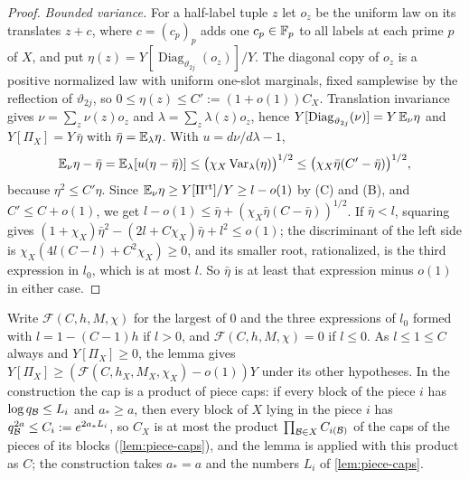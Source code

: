 \begin{proof}
\emph{Bounded variance.} For a half-label tuple $z$ let $o_z$ be the uniform law
on its translates $z+c$, where $c=(c_p)_p$ adds one $c_p\in\mathbb F_p$ to all labels at
each prime $p$ of $X$, and put $\eta(z)=Y[\operatorname{Diag}_{\vartheta_{2j}}
(o_z)]/Y$. The diagonal copy of $o_z$ is a positive normalized law with uniform
one-slot marginals, fixed samplewise by the reflection of $\vartheta_{2j}$, so
$0\le\eta(z)\le C':=(1+o(1))C_X$. Translation invariance gives
$\nu=\sum_z\nu(z)o_z$ and $\lambda=\sum_z\lambda(z)o_z$, hence
$Y[\operatorname{Diag}_{\vartheta_{2j}}(\nu)]=Y\,\mathbb E_\nu\eta$ and $Y[\Pi_X]=Y\,\bar\eta$
with $\bar\eta=\mathbb E_\lambda\eta$. With $u=d\nu/d\lambda-1$,
\[
 \mathbb E_\nu\eta-\bar\eta=\mathbb E_\lambda[u(\eta-\bar\eta)]
 \le\bigl(\chi_X\operatorname{Var}_\lambda(\eta)\bigr)^{1/2}
 \le\bigl(\chi_X\bar\eta(C'-\bar\eta)\bigr)^{1/2},
\]
because $\eta^2\le C'\eta$. Since $\mathbb E_\nu\eta\ge Y[\Pi^{\rm rt}]/Y\ge l-o(1)$ by
(C) and (B), and $C'\le C+o(1)$, we get
$l-o(1)\le\bar\eta+(\chi_X\bar\eta(C-\bar\eta))^{1/2}$. If $\bar\eta<l$, squaring
gives $(1+\chi_X)\bar\eta^2-(2l+C\chi_X)\bar\eta+l^2\le o(1)$; the discriminant of
the left side is $\chi_X(4l(C-l)+C^2\chi_X)\ge0$, and its smaller root,
rationalized, is the third expression in $l_0$, which is at most $l$. So
$\bar\eta$ is at least that expression minus $o(1)$ in either case.
\end{proof}

Write $\mathcal F(C,h,M,\chi)$ for the largest of $0$ and the three expressions
of $l_0$ formed with $l=1-(C-1)h$ if $l>0$, and $\mathcal F(C,h,M,\chi)=0$ if
$l\le0$. As $l\le1\le C$ always and $Y[\Pi_X]\ge0$, the lemma gives
$Y[\Pi_X]\ge(\mathcal F(C,h_X,M_X,\chi_X)-o(1))Y$ under its other hypotheses.
In the construction the cap is a product of piece caps: if every block of the
piece $i$ has $\log q_\mathcal B\le L_i$ and $a_*\ge a$, then every block of $X$ lying
in the piece $i$ has $q_\mathcal B^{2a}\le C_i:=e^{2a_*L_i}$, so $C_X$ is at most the
product $\prod_{\mathcal B\in X}C_{i(\mathcal B)}$ of the caps of the pieces of its blocks
(\cref{lem:piece-caps}), and the lemma is applied with this product as $C$; the
construction takes $a_*=a$ and the numbers $L_i$ of \cref{lem:piece-caps}.

